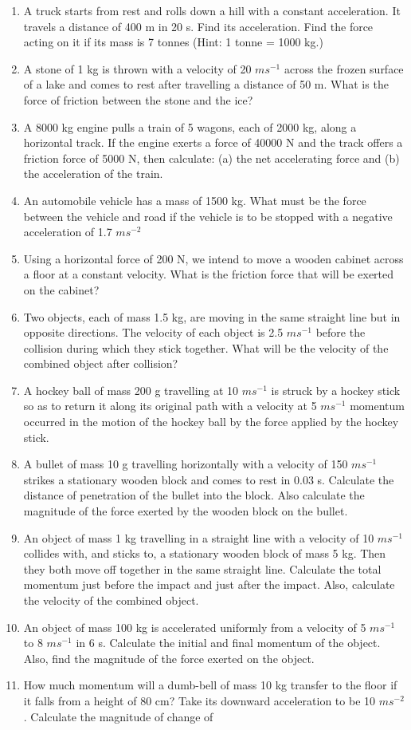 \begin{enumerate}[label=\arabic*.,ref=\thesubsection.\theenumi]
\item A truck starts from rest and rolls down a hill with a constant acceleration. It travels a distance of 400 m in 20 s. Find its acceleration. Find the force acting on it if its mass is 7 tonnes (Hint: 1 tonne = 1000 kg.)
\item  A stone of 1 kg is thrown with a velocity of 20 $m s^{-1}$ across
the frozen surface of a lake and comes to rest after travelling a distance of 50 m. What is the force of friction between the stone and the ice?
\item  A 8000 kg engine pulls a train of 5 wagons, each of 2000 kg, along a horizontal track. If the engine exerts a force of 40000 N and the track offers a friction force of 5000 N, then calculate: (a) the net accelerating force and (b) the acceleration of the train.
\item  An automobile vehicle has a mass of 1500 kg. What must be the force between the vehicle and road if the vehicle is to
be stopped with a negative acceleration of 1.7 $m s^{-2}$ 
\item  Using a horizontal force of 200 N, we intend to move a wooden cabinet across a floor at a constant velocity. What is the friction force that will be exerted on the cabinet?
\item  Two objects, each of mass 1.5 kg, are moving in the same straight line but in opposite directions. The velocity of each object is 2.5 $m s^{-1}$
before the collision during which they stick together. What will be the velocity of the combined object after collision?
\item A hockey ball of mass 200 g travelling at 10 $m s^{-1}$ is struck by
a hockey stick so as to return it along its original path with a velocity at 5 $m s^{-1}$
momentum occurred in the motion of the hockey ball by the force applied by the hockey stick.
\item  A bullet of mass 10 g travelling horizontally with a velocity of 150 $m s^{-1}$
strikes a stationary wooden block and comes to rest in 0.03 s. Calculate the distance of penetration of the bullet into the block. Also calculate the magnitude of the force exerted by the wooden block on the bullet.
\item  An object of mass 1 kg travelling in a straight line with a velocity of 10 $m s^{-1}$
collides with, and sticks to, a stationary wooden block of mass 5 kg. Then they both move off together in the same straight line. Calculate the total momentum just before the impact and just after the impact. Also, calculate the velocity of the combined object.
\item  An object of mass 100 kg is accelerated uniformly from a velocity of 5 $m s^{-1}$
to 8 $m s^{-1}$ in 6 s. Calculate the initial and final
momentum of the object. Also, find the magnitude of the force exerted on the object.
\item  How much momentum will a dumb-bell of mass 10 kg transfer to the floor if it falls from a height of 80 cm? Take its downward acceleration to be 10 $m s^{-2}$. Calculate the magnitude of change of


\end{enumerate}
